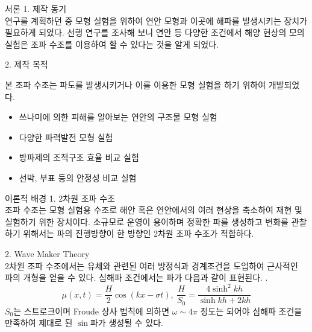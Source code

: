 \documentclass[Junlampaper, portrait]{Junlam_PosterK}
\begin{document}
\begin{poster}
\begin{posterbox}[name=intro,column=0]{서론}
    \small {1. 제작 동기 \\}
        \scriptsize {
        연구를 계획하던 중 모형 실험을 위하여 연안 모형과 이곳에 해파를 발생시키는 장치가 필요하게 되었다. 선행 연구를 조사해 보니 연안 등 다양한 조건에서 해양 현상의 모의 실험은 조파 수조를 이용하여 할 수 있다는 것을 알게 되었다\cite{chung2013}.\\}

    \small {2. 제작 목적\\} 
        \scriptsize {
        본 조파 수조는 파도를 발생시키거나 이를 이용한 모형 실험을 하기 위하여 개발되었다. 
          \begin{itemize}
            \item 쓰나미에 의한 피해를 알아보는 연안의 구조물 모형 실험
            \item 다양한 파력발전 모형 실험
            \item 방파제의 조적구조 효율 비교 실험
            \item 선박, 부표 등의 안정성 비교 실험
          \end{itemize}
          }
        \end{posterbox}

\begin{posterbox}[name=theo,column=0,below=intro]{이론적 배경}
   \small {1. 2차원 조파 수조\\} %
     \scriptsize {조파 수조는 모형 실험용 수조로 해안 혹은 연안에서의 여러 현상을 축소하여 재현 및 실험하기 위한 장치이다. 소규모로 운영이 용이하며 정확한 파를 생성하고 변화를 관찰하기 위해서는 파의 진행방향이 한 방향인 2차원 조파 수조가 적합하다. \\}
     
   \small {2. Wave Maker Theory\\}
     \scriptsize {
     2차원 조파 수조에서는 유체와 관련된 여러 방정식과 경계조건을 도입하여 근사적인 파의 개형을 얻을 수 있다. 심해파 조건에서는 파가 다음과 같이 표현된다. \cite{ART002413750, ART002785404, dean1991water}.
      \begin{equation*}
         \mu(x,t)=\frac{H}{2}\cos(kx-\sigma t),~\frac{H}{S_0}=\frac{4\sinh^2 kh}{\sinh kh + 2kh}
      \end{equation*}
         $S_0$는 스트로크이며 Froude 상사 법칙에 의하면 $\omega \sim 4\pi$ 정도는 되어야 심해파 조건을 만족하여 제대로 된 $\sin$파가 생성될 수 있다.}
 \vspace{0.8em}
\end{posterbox}



\end{poster}
\end{document}
